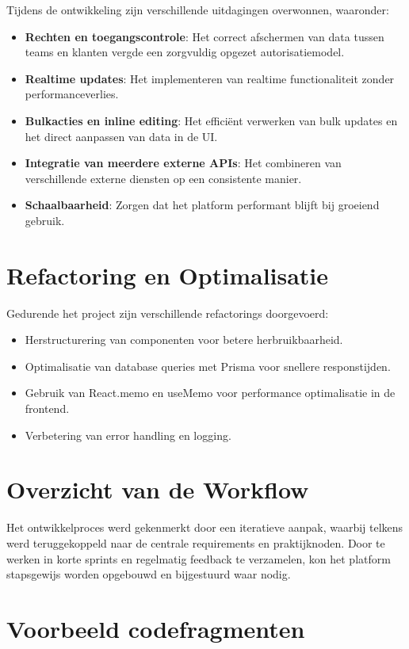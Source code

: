 Tijdens de ontwikkeling zijn verschillende uitdagingen overwonnen, waaronder:
\begin{itemize}
    \item \textbf{Rechten en toegangscontrole}: Het correct afschermen van data tussen teams en klanten vergde een zorgvuldig opgezet autorisatiemodel.
    \item \textbf{Realtime updates}: Het implementeren van realtime functionaliteit zonder performanceverlies.
    \item \textbf{Bulkacties en inline editing}: Het efficiënt verwerken van bulk updates en het direct aanpassen van data in de UI.
    \item \textbf{Integratie van meerdere externe APIs}: Het combineren van verschillende externe diensten op een consistente manier.
    \item \textbf{Schaalbaarheid}: Zorgen dat het platform performant blijft bij groeiend gebruik.
\end{itemize}

\section{Refactoring en Optimalisatie}
\label{sec:refactoring}

Gedurende het project zijn verschillende refactorings doorgevoerd:
\begin{itemize}
    \item Herstructurering van componenten voor betere herbruikbaarheid.
    \item Optimalisatie van database queries met Prisma voor snellere responstijden.
    \item Gebruik van React.memo en useMemo voor performance optimalisatie in de frontend.
    \item Verbetering van error handling en logging.
\end{itemize}

\section{Overzicht van de Workflow}
\label{sec:workflow}

Het ontwikkelproces werd gekenmerkt door een iteratieve aanpak, waarbij telkens werd teruggekoppeld naar de centrale requirements en praktijknoden. Door te werken in korte sprints en regelmatig feedback te verzamelen, kon het platform stapsgewijs worden opgebouwd en bijgestuurd waar nodig.

\section{Voorbeeld codefragmenten}
\label{sec:codefragmenten}


